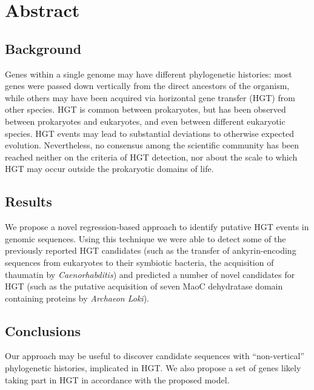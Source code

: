 \section{Abstract}
\label{abstract}

\subsection{Background}
\label{bg}
Genes within a single genome may have different phylogenetic histories: most
genes were passed down vertically from the direct ancestors of the
organism, while others may have been acquired via horizontal gene transfer
(HGT) from other species. HGT is common between prokaryotes, but has been
observed between prokaryotes and eukaryotes, and even between different
eukaryotic species. HGT events may lead to substantial deviations to otherwise
expected evolution.
Nevertheless, no consensus among the scientific community has been reached
neither on the criteria of HGT detection, nor about the scale to which HGT may
occur outside the prokaryotic domains of life.

\subsection{Results}
\label{res}
We propose a novel regression-based approach to identify putative HGT events in
genomic sequences. Using this technique we were able to detect some of the
previously reported HGT candidates (such as the transfer of ankyrin-encoding
sequences from eukaryotes to their symbiotic bacteria, the acquisition of
thaumatin by \textit{Caenorhabditis}) and predicted a number of novel candidates
for HGT (such as the putative acquisition of seven MaoC dehydratase domain
containing proteins by \textit{Archaeon Loki}).

\subsection{Conclusions}
\label{concl}
Our approach may be useful to discover candidate sequences with
``non-vertical'' phylogenetic histories, implicated in HGT. We also propose a
set of genes likely taking part in HGT in accordance with the proposed model.
